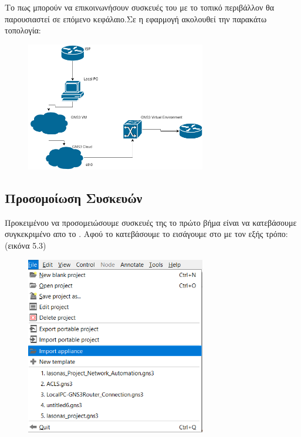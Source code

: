 Το πως μπορούν να επικοινωνήσουν συσκευές του  με το τοπικό περιβάλλον θα παρουσιαστεί σε επόμενο κεφάλαιο.Σε  η εφαρμογή ακολουθεί την παρακάτω τοπολογία:

\FloatBarrier

\begin{figure}[htb]
	\centering
	\includegraphics[width=0.7\textwidth]{graphics/diagram.drawio.png}
	\caption{ }
\end{figure}


\subsection{Προσομοίωση Συσκευών }

Προκειμένου να προσομειώσουμε συσκευές της  το πρώτο βήμα είναι να κατεβάσουμε συγκεκριμένο  απο το .
Αφού το κατεβάσουμε το εισάγουμε στο  με τον εξής τρόπο: (εικόνα 5.3)

\FloatBarrier

\begin{figure}[htb]
	\centering
	\includegraphics[width=0.7\textwidth]{graphics/import_appliance.png}
	\caption{ }
\end{figure}

